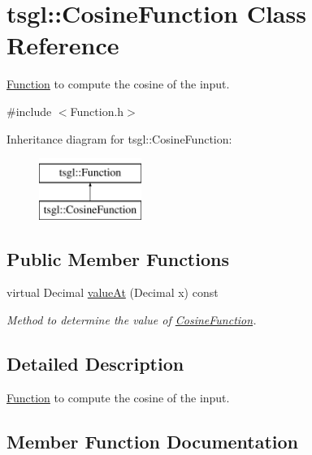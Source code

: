 \hypertarget{classtsgl_1_1_cosine_function}{}\section{tsgl\+:\+:Cosine\+Function Class Reference}
\label{classtsgl_1_1_cosine_function}


\hyperlink{classtsgl_1_1_function}{Function} to compute the cosine of the input.  




{\ttfamily \#include $<$Function.\+h$>$}

Inheritance diagram for tsgl\+:\+:Cosine\+Function\+:\begin{figure}[H]
\begin{center}
\leavevmode
\includegraphics[height=2.000000cm]{classtsgl_1_1_cosine_function}
\end{center}
\end{figure}
\subsection*{Public Member Functions}
\begin{DoxyCompactItemize}
\item 
virtual Decimal \hyperlink{classtsgl_1_1_cosine_function_a69b67c247afe02895d35da9a99bc0ffd}{value\+At} (Decimal x) const 
\begin{DoxyCompactList}\small\item\em Method to determine the value of \hyperlink{classtsgl_1_1_cosine_function}{Cosine\+Function}. \end{DoxyCompactList}\end{DoxyCompactItemize}


\subsection{Detailed Description}
\hyperlink{classtsgl_1_1_function}{Function} to compute the cosine of the input. 

\subsection{Member Function Documentation}
\hypertarget{classtsgl_1_1_cosine_function_a69b67c247afe02895d35da9a99bc0ffd}{}
